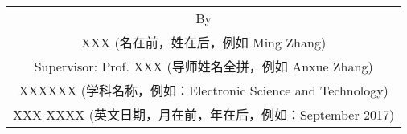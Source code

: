 \begin{titlepage}
\begin{center}
		\vspace{4cm}
		{\sanhao
			\begin{center} \renewcommand{\arraystretch}{1.5}
				\begin{tabular}{c}
					By \\
					XXX (名在前，姓在后，例如 Ming Zhang) \\
					Supervisor: Prof. XXX (导师姓名全拼，例如 Anxue Zhang) \\
					XXXXXX (学科名称，例如：Electronic Science and Technology) \\
					XXX XXXX (英文日期，月在前，年在后，例如：September 2017) \\
				\end{tabular} \renewcommand{\arraystretch}{1}
			\end{center} 
		}
	\end{center}
	\clearpage{\pagestyle{empty}\cleardoublepage}
\end{titlepage}
